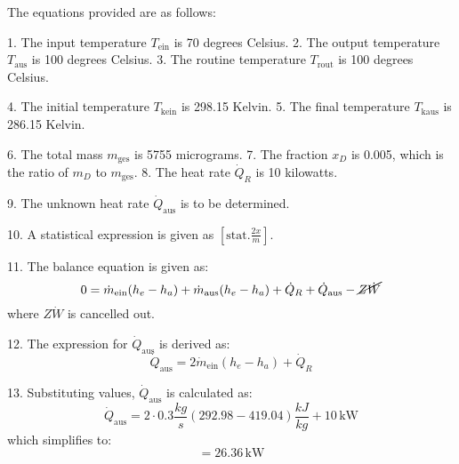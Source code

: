 The equations provided are as follows:

1. The input temperature \( T_{\text{ein}} \) is 70 degrees Celsius.
2. The output temperature \( T_{\text{aus}} \) is 100 degrees Celsius.
3. The routine temperature \( T_{\text{rout}} \) is 100 degrees Celsius.

4. The initial temperature \( T_{\text{kein}} \) is 298.15 Kelvin.
5. The final temperature \( T_{\text{kaus}} \) is 286.15 Kelvin.

6. The total mass \( m_{\text{ges}} \) is 5755 micrograms.
7. The fraction \( x_D \) is 0.005, which is the ratio of \( m_D \) to \( m_{\text{ges}} \).
8. The heat rate \( \dot{Q}_R \) is 10 kilowatts.

9. The unknown heat rate \( \dot{Q}_{\text{aus}} \) is to be determined.

10. A statistical expression is given as \( \left[ \text{stat.} \frac{2x}{m} \right] \).

11. The balance equation is given as:
   \[
   0 = \dot{m}_{\text{ein}} (h_e - h_a) + \dot{m}_{\text{aus}} (h_e - h_a) + \dot{Q}_R + \dot{Q}_{\text{aus}} - \cancel{Z\dot{W}}
   \]
   where \( Z\dot{W} \) is cancelled out.

12. The expression for \( \dot{Q}_{\text{aus}} \) is derived as:
    \[
    \dot{Q}_{\text{aus}} = 2\dot{m}_{\text{ein}} (h_e - h_a) + \dot{Q}_R
    \]

13. Substituting values, \( \dot{Q}_{\text{aus}} \) is calculated as:
    \[
    \dot{Q}_{\text{aus}} = 2 \cdot 0.3 \frac{kg}{s} (292.98 - 419.04) \frac{kJ}{kg} + 10\,\text{kW}
    \]
    which simplifies to:
    \[
    = 26.36\,\text{kW}
    \]